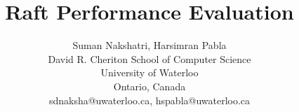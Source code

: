 \documentclass{sig-alternate-10pt}
\begin{document}
\setcounter{secnumdepth}{2}

\title{Raft Performance Evaluation}


\author{Suman Nakshatri, Harsimran Pabla \\David R. Cheriton School of Computer Science\\University of Waterloo\\Ontario, Canada\\ sdnaksha@uwaterloo.ca, hspabla@uwaterloo.ca}

\maketitle



















\end{document}
